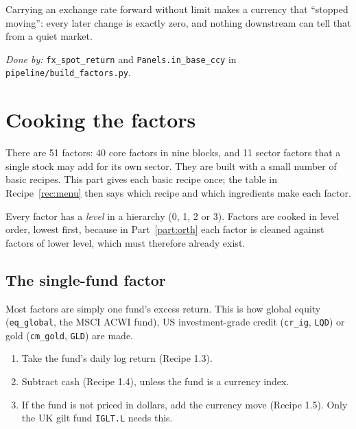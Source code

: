 \documentclass[11pt,a4paper]{article}
\newcommand{\fid}[1]{\texttt{#1}}
\newcommand{\doneby}[1]{\par{\raggedright\small\textit{Done by:} #1\par}}
\begin{document}
\begin{warn}
Carrying an exchange rate forward without limit makes a currency that ``stopped
moving'': every later change is exactly zero, and nothing downstream can tell that
from a quiet market.
\end{warn}

\doneby{\texttt{fx\_spot\_return} and \texttt{Panels.in\_base\_ccy} in \texttt{pipeline/build\_factors.py}.}

\section{Cooking the factors}

There are 51 factors: 40 core factors in nine blocks, and 11 sector factors that a
single stock may add for its own sector. They are built with a small number of
basic recipes. This part gives each basic recipe once; the table in
Recipe~\ref{rec:menu} then says which recipe and which ingredients make each factor.

Every factor has a \emph{level} in a hierarchy (0, 1, 2 or 3). Factors are cooked in
level order, lowest first, because in Part~\ref{part:orth} each factor is cleaned
against factors of lower level, which must therefore already exist.

\subsection{The single-fund factor}\label{rec:single}

Most factors are simply one fund's excess return. This is how global equity
(\fid{eq\_global}, the MSCI ACWI fund), US investment-grade credit
(\fid{cr\_ig}, \texttt{LQD}) or gold (\fid{cm\_gold}, \texttt{GLD}) are made.

\begin{method}
\begin{enumerate}[leftmargin=1.4em]
  \item Take the fund's daily log return (Recipe 1.3).
  \item Subtract cash (Recipe 1.4), unless the fund is a currency index.
  \item If the fund is not priced in dollars, add the currency move (Recipe 1.5). Only the UK gilt fund \texttt{IGLT.L} needs this.
\end{enumerate}
\end{method}
\end{document}

